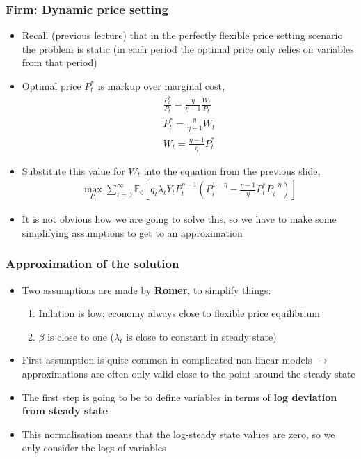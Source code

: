 \documentclass[10pt, xcolor=x11names, table]{beamer}
\begin{document}
\begin{frame}
\frametitle{Firm: Dynamic price setting}
\small
\begin{itemize}
\item Recall (previous lecture) that in the perfectly flexible price setting scenario the problem is static (in each period the optimal price only relies on variables from that period)
\item Optimal price $P^{*}_{t}$ is markup over marginal cost,
\begin{align*}
\frac{P^{*}_{t}}{P_{t}} = \frac{\eta}{\eta -1}\frac{W_{t}}{P_{t}} \\
P^{*}_{t} = \frac{\eta}{\eta -1}W_{t} \\
W_{t} = \frac{\eta-1}{\eta}P^{*}_{t}
\end{align*}
\item Substitute this value for $W_{t}$ into the equation from the previous slide,
\begin{align*}
\max_{P_{i}} \sum^{\infty}_{t=0}\mathbb{E}_{0}\left[q_{t}\lambda_{t}Y_{t}P_{t}^{\eta-1}(P_{i}^{1-\eta} - \frac{\eta-1}{\eta}P^{*}_{t}P_{i}^{-\eta})\right]
\end{align*}
\item It is not obvious how we are going to solve this, so we have to make some simplifying assumptions to get to an approximation
\end{itemize}
\end{frame}


\begin{frame}
\frametitle{Approximation of the solution}
\begin{itemize}
\item Two assumptions are made by \textbf{Romer}, to simplify things:
\begin{enumerate}
\item Inflation is low; economy always close to flexible price equilibrium
\item $\beta$ is close to one ($\lambda_{t}$ is close to constant in steady state)
\end{enumerate}
\item First assumption is quite common in complicated non-linear models $\rightarrow$ approximations are often only valid close to the point around the steady state
\item The first step is going to be to define variables in terms of \textbf{log deviation from steady state}
\item This normalisation means that the log-steady state values are zero, so we only consider the logs of variables
\end{itemize}
\end{frame}
\end{document}
